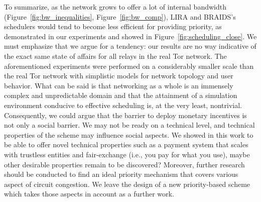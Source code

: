  
To summarize, as the network grows to offer a lot of internal bandwidth (Figure~\ref{fig:bw_inequalities}, Figure~\ref{fig:bw_comp}), LIRA and BRAIDS's schedulers would tend to become less efficient for providing priority, as demonstrated in our experiments and showed in Figure~\ref{fig:scheduling_close}. 
We must emphasize that we argue for a tendency: our results are no way indicative of the exact same state of affairs for all relays in the real Tor network. The aforementioned experiments
were performed on a considerably smaller scale than the real Tor network with simplistic models for
network topology and user behavior. What can be said is that networking as a
whole is an immensely complex and unpredictable domain and that the attainment
of a simulation environment conducive to effective scheduling is, at the very
least, nontrivial. Consequently, we could argue that the barrier to deploy monetary incentives is not only a social barrier. We may not be ready on a technical level, and technical properties of the scheme may influence social aspects. We showed in this work to be able to offer novel technical properties such as a payment system that scales with trustless entities and fair-exchange (i.e., you pay for what you use), maybe other desirable properties remain to be discovered? Moreover, further research should be conducted to find an ideal priority mechanism that covers various
aspect of circuit congestion. We leave the design of a new priority-based scheme which takes those aspects in account as a further work.

